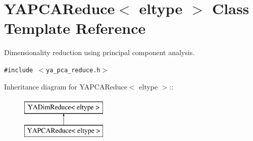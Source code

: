 \hypertarget{class_y_a_p_c_a_reduce}{
\section{YAPCAReduce$<$ eltype $>$ Class Template Reference}
\label{class_y_a_p_c_a_reduce}
}
Dimensionality reduction using principal component analysis.  


{\tt \#include $<$ya\_\-pca\_\-reduce.h$>$}

Inheritance diagram for YAPCAReduce$<$ eltype $>$::\begin{figure}[H]
\begin{center}
\leavevmode
\includegraphics[height=2cm]{class_y_a_p_c_a_reduce}
\end{center}
\end{figure}
